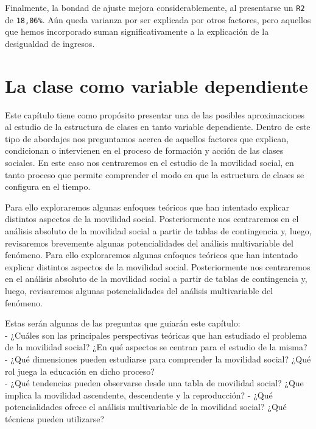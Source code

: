 \documentclass[
]{article}
\begin{document}
Finalmente, la bondad de ajuste mejora considerablemente, al presentarse un \texttt{R2} de \texttt{18,06\%}. Aún queda varianza por ser explicada por otros factores, pero aquellos que hemos incorporado suman significativamente a la explicación de la desigualdad de ingresos.

\hypertarget{dependiente}{%
\section{La clase como variable dependiente}\label{dependiente}}

Este capítulo tiene como propósito presentar una de las posibles aproximaciones al estudio de la estructura de clases en tanto variable dependiente. Dentro de este tipo de abordajes nos preguntamos acerca de aquellos factores que explican, condicionan o intervienen en el proceso de formación y acción de las clases sociales. En este caso nos centraremos en el estudio de la movilidad social, en tanto proceso que permite comprender el modo en que la estructura de clases se configura en el tiempo.

Para ello exploraremos algunas enfoques teóricos que han intentado explicar distintos aspectos de la movilidad social. Posteriormente nos centraremos en el análisis absoluto de la movilidad social a partir de tablas de contingencia y, luego, revisaremos brevemente algunas potencialidades del análisis multivariable del fenómeno. Para ello exploraremos algunas enfoques teóricos que han intentado explicar distintos aspectos de la movilidad social. Posteriormente nos centraremos en el análisis absoluto de la movilidad social a partir de tablas de contingencia y, luego, revisaremos algunas potencialidades del análisis multivariable del fenómeno.

Estas serán algunas de las preguntas que guiarán este capítulo:\\
- ¿Cuáles son las principales perspectivas teóricas que han estudiado el problema de la movilidad social? ¿En qué aspectos se centran para el estudio de la misma?\\
- ¿Qué dimensiones pueden estudiarse para comprender la movilidad social? ¿Qué rol juega la educación en dicho proceso?\\
- ¿Qué tendencias pueden observarse desde una tabla de movilidad social? ¿Que implica la movilidad ascendente, descendente y la reproducción?
- ¿Qué potencialidades ofrece el análisis multivariable de la movilidad social? ¿Qué técnicas pueden utilizarse?
\end{document}

